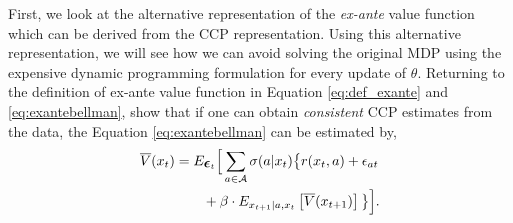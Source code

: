 \documentclass{article}
\renewcommand{\vec}[1]{\mbox{\bm{$#1$}}}
\begin{document}
First, we look at the alternative representation of the \emph{ex-ante} value function which can be derived from the CCP representation. Using this alternative representation, we will see how we can avoid solving the original MDP using the expensive dynamic programming formulation for every update of $\theta$.
%
%
Returning to the definition of ex-ante value function in Equation \eqref{eq:def_exante} and \eqref{eq:exantebellman},
%
\cite{hotz} show that if one can obtain \textit{consistent} CCP estimates from the data, the Equation \eqref{eq:exantebellman} can be estimated by,
\begin{align} \label{eq:exantebellman_2}
\begin{split}
\overline{V}(x_t) & = E_{\vec{\epsilon}_t}\Big[\sum_{a\in\mathcal{A}} \sigma(a|x_t) \big\{r(x_t,a)+\epsilon_{at} \\
& \qquad +\beta  \cdot E_{x_{t+1}|a,x_t} \left[ \overline{V}(x_{t+1}) \right] \big\}\Big].\\
\end{split}
\end{align}
\end{document}
